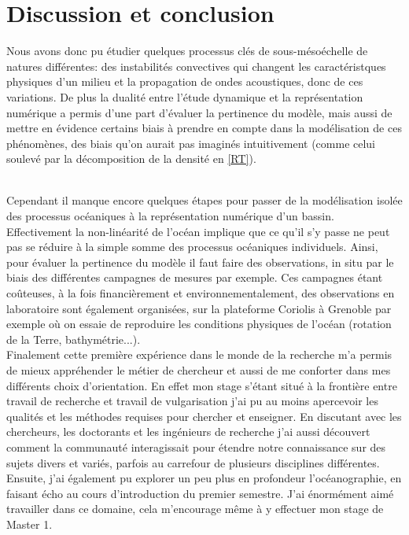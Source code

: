 \documentclass{rapportECC}
\begin{document}
\section{Discussion et conclusion}


Nous avons donc pu étudier quelques processus clés de sous-mésoéchelle de natures différentes: des instabilités convectives qui changent les caractéristques physiques d'un milieu et la propagation de ondes acoustiques, donc de ces variations. De plus la dualité entre l'étude dynamique et la représentation numérique a permis d'une part d'évaluer la pertinence du modèle, mais aussi de mettre en évidence certains biais à prendre en compte dans la modélisation de ces phénomènes, des biais qu'on aurait pas imaginés intuitivement (comme celui soulevé par la décomposition de la densité en \ref{RT}). 


\\
Cependant il manque encore quelques étapes pour passer de la modélisation isolée des processus océaniques à la représentation numérique d'un bassin. Effectivement la non-linéarité de l'océan implique que ce qu'il s'y passe ne peut pas se réduire à la simple somme des processus océaniques individuels. Ainsi, pour évaluer la pertinence du modèle il faut faire des observations, in situ par le biais des différentes campagnes de mesures par exemple. Ces campagnes étant coûteuses, à la fois financièrement et environnementalement, des observations en laboratoire sont également organisées, sur la plateforme Coriolis à Grenoble par exemple où on essaie de reproduire les conditions physiques de l'océan (rotation de la Terre, bathymétrie...).
\\
Finalement cette première expérience dans le monde de la recherche m'a permis de mieux appréhender le métier de chercheur et aussi de me conforter dans mes différents choix d'orientation. En effet mon stage s'étant situé à la frontière entre travail de recherche et travail de vulgarisation j'ai pu au moins apercevoir les qualités et les méthodes requises pour chercher et enseigner. En discutant avec les chercheurs, les doctorants et les ingénieurs de recherche j'ai aussi découvert comment la communauté interagissait pour étendre notre connaissance sur des sujets divers et variés, parfois au carrefour de plusieurs disciplines différentes. Ensuite, j'ai également pu explorer un peu plus en profondeur l'océanographie, en faisant écho au cours d'introduction du premier semestre. J'ai énormément aimé travailler dans ce domaine, cela m'encourage même à y effectuer mon stage de Master 1.
\end{document}
